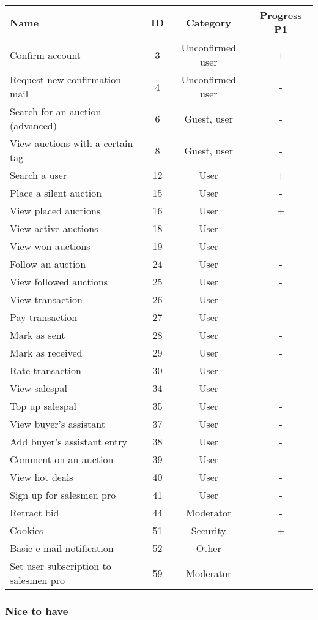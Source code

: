 	\begin{tabular}{l|c c | c}
	  Name & ID & Category & Progress P1\\ 
	  \hline
	  Confirm account & 3 & Unconfirmed user & +\\
	  Request new confirmation mail & 4 & Unconfirmed user & -\\
	  Search for an auction (advanced) & 6 & Guest, user & - \\
	  View auctions with a certain tag & 8 & Guest, user & -\\
	  Search a user & 12 & User & +\\
	  Place a silent auction & 15 & User & -\\
	  View placed auctions & 16 & User & +\\
	  View active auctions & 18 & User & -\\
	  View won auctions & 19 & User & -\\
	  Follow an auction & 24 & User & -\\
	  View followed auctions & 25 & User & -\\
	  View transaction & 26 & User & -\\
	  Pay transaction & 27 & User & -\\
	  Mark as sent & 28 & User & -\\
	  Mark as received & 29 & User & -\\
	  Rate transaction & 30 & User & -\\
	  View salespal & 34 & User & -\\
	  Top up salespal & 35 & User & -\\
	  View buyer's assistant & 37 & User & -\\
	  Add buyer's assistant entry & 38 & User & -\\
	  Comment on an auction & 39 & User & -\\
	  View hot deals & 40 & User & -\\
	  Sign up for salesmen pro & 41 & User & -\\
	  Retract bid & 44 & Moderator & -\\
	  Cookies & 51 & Security & +\\	  
	  Basic e-mail notification & 52 & Other & - \\	  
	  Set user subscription to salesmen pro & 59 & Moderator & -
	\end{tabular} 
	
	\subsubsection{Nice to have}
	
